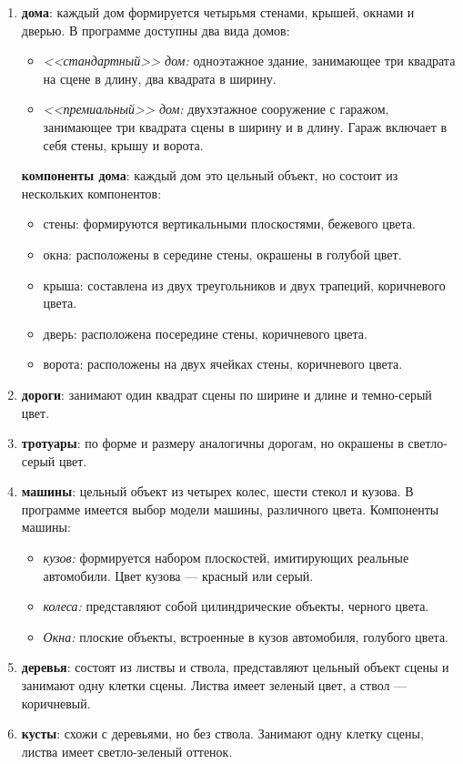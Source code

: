 \begin{enumerate}
\item \textbf{дома}: каждый дом формируется четырьмя стенами, крышей, окнами и дверью. В программе доступны два вида домов:

\begin{itemize}
	\item \textit{<<стандартный>> дом:} одноэтажное здание, занимающее три квадрата на сцене в длину, два квадрата в ширину.
	\item \textit{<<премиальный>> дом:} двухэтажное сооружение с гаражом, занимающее три квадрата сцены в ширину и в длину. Гараж включает в себя стены, крышу и ворота.
\end{itemize}

 \textbf{компоненты дома}: каждый дом это цельный объект, но состоит из нескольких компонентов:
\begin{itemize}
	\item стены: формируются вертикальными плоскостями, бежевого цвета.
	\item окна: расположены в середине стены, окрашены в голубой цвет.
	\item крыша: составлена из двух треугольников и двух трапеций, коричневого цвета.
	\item дверь: расположена посередине стены, коричневого цвета.
	\item ворота: расположены на двух ячейках стены, коричневого цвета.
\end{itemize}

\item \textbf{дороги}: занимают один квадрат сцены по ширине и длине и темно-серый цвет.
\item \textbf{тротуары}: по форме и размеру аналогичны дорогам, но окрашены в светло-серый цвет.
\item \textbf{машины}:  цельный объект из четырех колес, шести стекол и кузова. В программе имеется выбор модели машины,  различного цвета. Компоненты машины: 

\begin{itemize}
	\item \textit{кузов: }формируется набором плоскостей, имитирующих реальные автомобили. Цвет кузова --- красный или серый.
	\item \textit{колеса:} представляют собой цилиндрические объекты, черного цвета.
	\item \textit{Окна:} плоские объекты, встроенные в кузов автомобиля, голубого цвета.
\end{itemize}

\item \textbf{деревья}: состоят из листвы и ствола, представляют цельный объект сцены и занимают одну клетки сцены. Листва имеет зеленый цвет, а ствол --- коричневый.
\item \textbf{кусты}: схожи с деревьями, но без ствола. Занимают одну клетку сцены, листва имеет светло-зеленый оттенок.
\end{enumerate}

